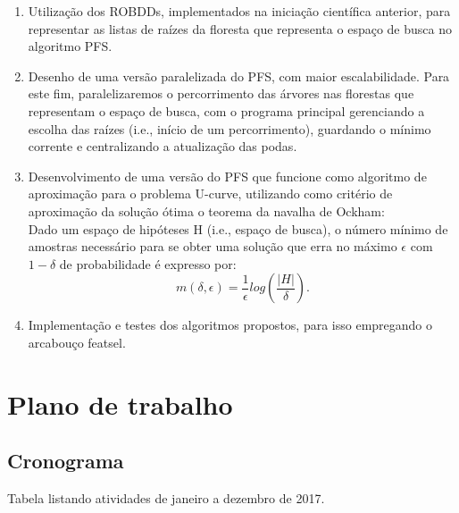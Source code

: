 \documentclass[12pt]{article}
\begin{document}
\begin{enumerate}
\item Utilização dos ROBDDs, implementados na iniciação científica
anterior, para representar as listas de raízes da floresta que 
representa o espaço de busca no algoritmo PFS.

\item Desenho de uma versão paralelizada do PFS, com maior
escalabilidade. Para este fim, paralelizaremos o percorrimento das
árvores nas florestas que representam o espaço de busca, com o programa
principal gerenciando a escolha das raízes (i.e., início de um 
percorrimento), guardando o mínimo corrente e centralizando a
atualização das podas.

\item Desenvolvimento de uma versão do PFS que funcione como algoritmo 
de aproximação para o problema U-curve, utilizando como critério de
aproximação da solução ótima o teorema da navalha de Ockham:\\
\smallskip
Dado um espaço de hipóteses H (i.e., espaço de busca), o número mínimo 
de amostras necessário para se obter uma solução que erra no máximo 
$\epsilon$ com $1 - \delta$ de probabilidade é expresso por:
\begin{equation}
\displaystyle  m(\delta,\epsilon) = 
    \frac{1}{\epsilon} log (\frac{|H|}{\delta}).
\end{equation}

\item Implementação e testes dos algoritmos propostos, para isso
empregando o arcabouço featsel.
\end{enumerate}


\section{Plano de trabalho}
\subsection{Cronograma}
Tabela listando atividades de janeiro a dezembro de 2017.
\end{document}
